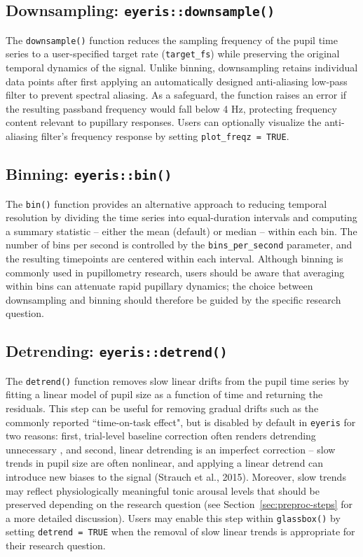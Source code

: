 \subsection{Downsampling: \texttt{eyeris::downsample()}}
The \texttt{downsample()} function reduces the sampling frequency of the pupil time series to a user-specified target rate (\texttt{target\_fs}) while preserving the original temporal dynamics of the signal. Unlike binning, downsampling retains individual data points after first applying an automatically designed anti-aliasing low-pass filter to prevent spectral aliasing. As a safeguard, the function raises an error if the resulting passband frequency would fall below 4 Hz, protecting frequency content relevant to pupillary responses. Users can optionally visualize the anti-aliasing filter’s frequency response by setting \texttt{plot\_freqz = TRUE}.

\subsection{Binning: \texttt{eyeris::bin()}}
The \texttt{bin()} function provides an alternative approach to reducing temporal resolution by dividing the time series into equal-duration intervals and computing a summary statistic – either the mean (default) or median – within each bin. The number of bins per second is controlled by the \texttt{bins\_per\_second} parameter, and the resulting timepoints are centered within each interval. Although binning is commonly used in pupillometry research, users should be aware that averaging within bins can attenuate rapid pupillary dynamics; the choice between downsampling and binning should therefore be guided by the specific research question.

\subsection{Detrending: \texttt{eyeris::detrend()}}
The \texttt{detrend()} function removes slow linear drifts from the pupil time series by fitting a linear model of pupil size as a function of time and returning the residuals. This step can be useful for removing gradual drifts such as the commonly reported ``time-on-task effect", but is disabled by default in \texttt{eyeris} for two reasons: first, trial-level baseline correction often renders detrending unnecessary \parencite[see][for a detailed discussion of the tradeoffs between subtractive and divisive baseline correction approaches]{mathot2018safe}, and second, linear detrending is an imperfect correction – slow trends in pupil size are often nonlinear, and applying a linear detrend can introduce new biases to the signal (Strauch et al., 2015). Moreover, slow trends may reflect physiologically meaningful tonic arousal levels that should be preserved depending on the research question (see Section~\ref{sec:preproc-steps} for a more detailed discussion). Users may enable this step within \texttt{glassbox()} by setting \texttt{detrend = TRUE} when the removal of slow linear trends is appropriate for their research question.

